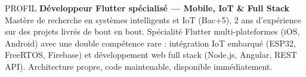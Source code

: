 \documentclass{resume}
\begin{document}


\begin{rSection}{PROFIL}
\textbf{Développeur Flutter spécialisé — Mobile, IoT \& Full Stack} \\[4pt]
Mastère de recherche en systèmes intelligents et IoT (Bac+5), 2 ans d'expérience sur des projets livrés de bout en bout. Spécialité Flutter multi-plateformes (iOS, Android) avec une double compétence rare : intégration IoT embarqué (ESP32, FreeRTOS, Firebase) et développement web full stack (Node.js, Angular, REST API). Architecture propre, code maintenable, disponible immédiatement.

\end{rSection}
\end{document}
